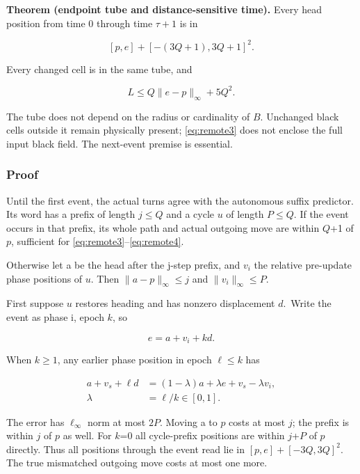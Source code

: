 \documentclass[
  11pt,
]{article}
\begin{document}
\textbf{Theorem (endpoint tube and distance-sensitive time).} Every
head position from time 0 through time \(\tau+1\) is in

\begin{equation}\label{eq:remote3}
[p,e]+[-(3Q+1),3Q+1]^2.
\end{equation}

Every changed cell is in the same tube, and

\begin{equation}\label{eq:remote4}
L\le Q\|e-p\|_\infty+5Q^2.
\end{equation}

The tube does not depend on the radius or cardinality of \(B\). Unchanged
black cells outside it remain physically present; \eqref{eq:remote3} does not
enclose the full input black field. The next-event premise is essential.

\subsubsection{Proof}\label{proof}

Until the first event, the actual turns agree with the autonomous suffix
predictor. Its word has a prefix of length $j\le Q$ and a cycle \(u\) of
length $P\le Q$. If the event occurs in that prefix, its whole path
and actual outgoing move are within \(Q\)+1 of \(p\), sufficient for
\eqref{eq:remote3}--\eqref{eq:remote4}.

Otherwise let a be the head after the j-step prefix, and $v_i$ the
relative pre-update phase positions of \(u\). Then
$\|a-p\|_\infty\le j$ and
$\|v_i\|_\infty\le P$.

First suppose \(u\) restores heading and has nonzero displacement \(d\).~Write
the event as phase i, epoch \(k\), so

\[
e=a+v_i+kd.
\]

When $k\ge1$, any earlier phase position in epoch $\ell\le k$
has

\begin{equation}\label{eq:remote5}
\begin{aligned}a+v_s+\ell d&=(1-\lambda)a+\lambda e+v_s-\lambda v_i,\\ \lambda&=\ell/k\in[0,1].\end{aligned}
\end{equation}

The error has $\ell_\infty$ norm at most \(2P\). Moving a to \(p\) costs at most
\(j\); the prefix is within \(j\) of \(p\) as well. For \(k\)=0 all cycle-prefix
positions are within \(j\)+\(P\) of \(p\) directly. Thus all positions through the
event read lie in $[p,e]+[-3Q,3Q]^2$. The true mismatched
outgoing move costs at most one more.
\end{document}
